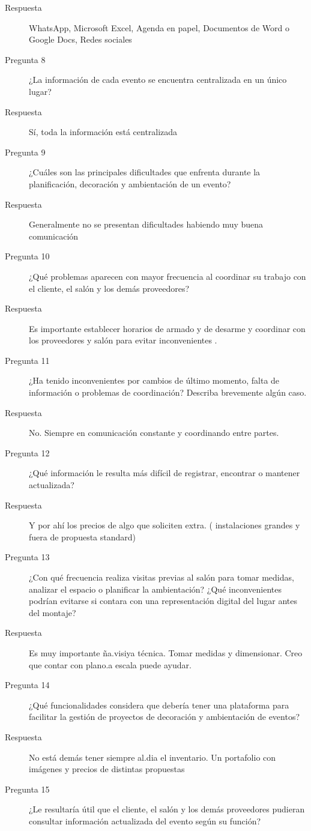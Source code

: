 \begin{description}
    \item[Respuesta] WhatsApp, Microsoft Excel, Agenda en papel, Documentos de Word o Google Docs, Redes sociales
    \item[Pregunta 8] ¿La información de cada evento se encuentra centralizada en un único lugar?
    \item[Respuesta] Sí, toda la información está centralizada
    \item[Pregunta 9] ¿Cuáles son las principales dificultades que enfrenta durante la planificación, decoración y ambientación de un evento?
    \item[Respuesta] Generalmente no se presentan dificultades habiendo muy buena comunicación
    \item[Pregunta 10] ¿Qué problemas aparecen con mayor frecuencia al coordinar su trabajo con el cliente, el salón y los demás proveedores?
    \item[Respuesta] Es importante establecer horarios de armado y de desarme y coordinar con los proveedores y salón para evitar inconvenientes .
    \item[Pregunta 11] ¿Ha tenido inconvenientes por cambios de último momento, falta de información o problemas de coordinación? Describa brevemente algún caso.
    \item[Respuesta] No. Siempre en comunicación constante y coordinando entre partes.
    \item[Pregunta 12] ¿Qué información le resulta más difícil de registrar, encontrar o mantener actualizada?
    \item[Respuesta] Y por ahí los precios de algo que soliciten extra. ( instalaciones grandes y fuera de propuesta standard)
    \item[Pregunta 13] ¿Con qué frecuencia realiza visitas previas al salón para tomar medidas, analizar el espacio o planificar la ambientación? ¿Qué inconvenientes podrían evitarse si contara con una representación digital del lugar antes del montaje?
    \item[Respuesta] Es muy importante ña.visiya técnica. Tomar medidas y dimensionar. Creo que contar con plano.a escala puede ayudar.
    \item[Pregunta 14] ¿Qué funcionalidades considera que debería tener una plataforma para facilitar la gestión de proyectos de decoración y ambientación de eventos?
    \item[Respuesta] No está demás tener siempre al.dia el inventario. Un portafolio con imágenes y precios de distintas propuestas
    \item[Pregunta 15] ¿Le resultaría útil que el cliente, el salón y los demás proveedores pudieran consultar información actualizada del evento según su función?

\end{description}
